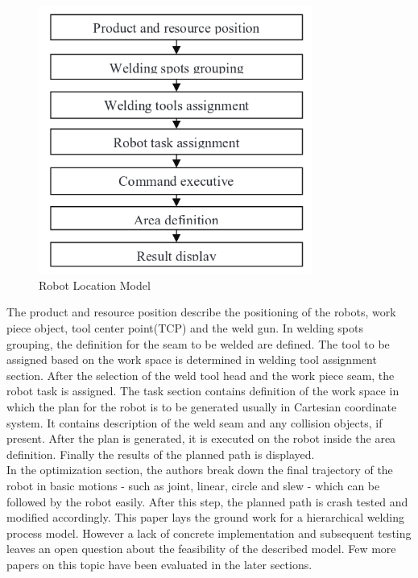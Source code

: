\begin{figure}[htbp] %
 \centering
   \includegraphics[width=9cm]{images/robotlocproc.png}
   \caption[Robot Location Model]
   {Robot Location Model \footnotemark[\value{footnote}]}  
\label{fig:img6}
\end{figure}
The product and resource position describe the positioning of the robots, work piece object, tool center point(TCP) and the weld gun. In welding spots grouping, the definition for the seam to be welded are defined. The tool to be assigned based on the work space is determined in welding tool assignment section. After the selection of the weld tool head and the work piece seam, the robot task is assigned. The task section contains definition of the work space in which the plan for the robot is to be generated usually in Cartesian coordinate system. It contains description of the weld seam and any collision objects, if present. After the plan is generated, it is executed on the robot inside the area definition. Finally the results of the planned path is displayed. \\ In the optimization section, the authors break down the final trajectory of the robot in basic motions -  such as joint, linear, circle and slew - which can be followed by the robot easily. After this step, the planned path is crash tested and modified accordingly. This paper lays the ground work for a hierarchical welding process model. However a lack of concrete implementation and subsequent testing leaves an open question about the feasibility of the described model. Few more papers on this topic have been evaluated in the later sections.

